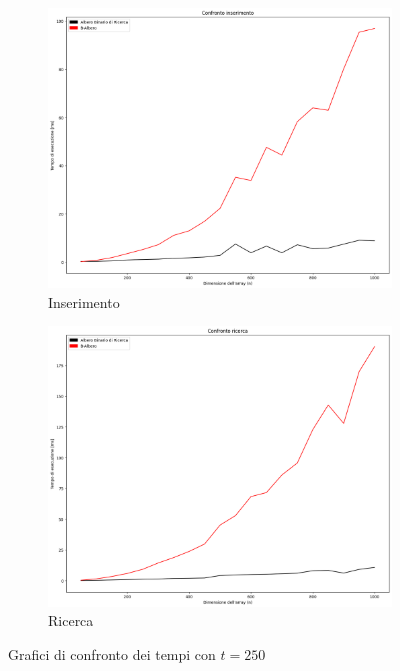 \begin{figure}[H]
    \centering
    \begin{subfigure}[b]{0.49\textwidth}
        \centering
        \includegraphics[width=\textwidth]{comparison-graphs/insert-ms-t250.png}
        \caption{Inserimento}
        \label{fig:compgraphinserttimet250}
    \end{subfigure}
    \hfill
    \begin{subfigure}[b]{0.49\textwidth}
        \centering
        \includegraphics[width=\textwidth]{comparison-graphs/search-ms-t250.png}
        \caption{Ricerca}
        \label{fig:compgraphsearchtimet250}
    \end{subfigure}
    \caption{Grafici di confronto dei tempi con $t=250$}
    \label{fig:compgraphtimest250}
\end{figure}


